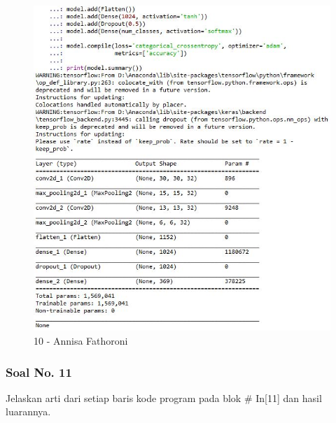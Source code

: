 \begin{itemize}
\begin{figure}[!hbtp]
\centering
\includegraphics[scale=0.7]{figures/Chapter 7/1164067/Praktek/Chapter7AnnisaFathoroni10.jpg}
\caption{10 - Annisa Fathoroni}
\label{10 - Annisa Fathoroni}
\end{figure}

\end{itemize}

\subsubsection{Soal No. 11}
Jelaskan arti dari setiap baris kode program pada blok \# In[11] dan hasil luarannya.

